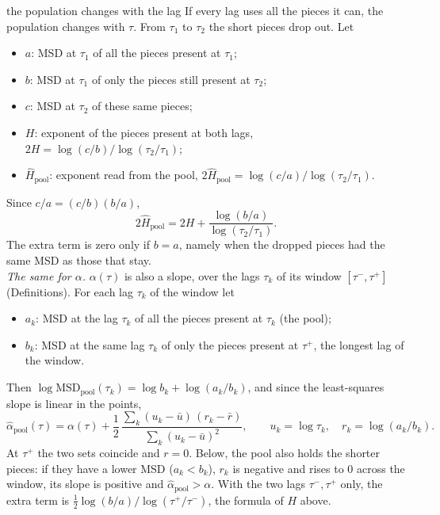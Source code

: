 \documentclass[10pt,a4paper]{article}
\begin{document}
\begin{problembox}{the population changes with the lag}
  If every lag uses all the pieces it can, the population changes with $\tau$. From $\tau_1$ to $\tau_2$
  the short pieces drop out. Let
  \begin{itemize}
  \item $a$: MSD at $\tau_1$ of all the pieces present at $\tau_1$;
  \item $b$: MSD at $\tau_1$ of only the pieces still present at $\tau_2$;
  \item $c$: MSD at $\tau_2$ of these same pieces;
  \item $H$: exponent of the pieces present at both lags, $2H = \log(c/b)/\log(\tau_2/\tau_1)$;
  \item $\hat H_\mathrm{pool}$: exponent read from the pool, $2\hat H_\mathrm{pool} = \log(c/a)/\log(\tau_2/\tau_1)$.
  \end{itemize}
  Since $c/a = (c/b)(b/a)$,
  \[ 2\hat H_\mathrm{pool} = 2H + \frac{\log(b/a)}{\log(\tau_2/\tau_1)}. \]
  The extra term is zero only if $b=a$, namely when the dropped pieces had the same MSD as those that stay.\\

  \emph{The same for $\alpha$.} $\alpha(\tau)$ is also a slope, over the lags $\tau_k$ of its window
  $[\tau^-,\tau^+]$ (Definitions). For each lag $\tau_k$ of the window let
  \begin{itemize}
  \item $a_k$: MSD at the lag $\tau_k$ of all the pieces present at $\tau_k$ (the pool);
  \item $b_k$: MSD at the same lag $\tau_k$ of only the pieces present at $\tau^+$, the longest lag of the window.
  \end{itemize}
  Then
  $\log\mathrm{MSD}_\mathrm{pool}(\tau_k)=\log b_k+\log(a_k/b_k)$, and since the least-squares slope is linear in
  the points,
  \[ \hat\alpha_\mathrm{pool}(\tau) = \alpha(\tau) + \frac12\,\frac{\sum_k(u_k-\bar u)\,(r_k-\bar r)}{\sum_k(u_k-\bar u)^2},
     \qquad u_k=\log \tau_k,\quad r_k=\log(a_k/b_k). \]
  At $\tau^+$ the two sets coincide and $r=0$. Below, the pool also holds the shorter pieces: if they have a
  lower MSD ($a_k<b_k$), $r_k$ is negative and rises to 0 across the window, its slope is positive and
  $\hat\alpha_\mathrm{pool}>\alpha$. With the two lags $\tau^-,\tau^+$ only, the extra term is
  $\tfrac12\log(b/a)/\log(\tau^+/\tau^-)$, the formula of $H$ above.
\end{problembox}
\end{document}
